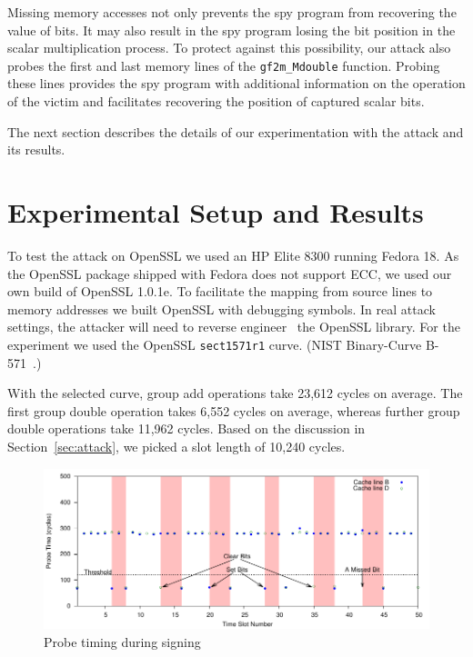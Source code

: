 \documentclass[twocolumn]{svjour3}
\newcommand{\myupcase}[1]{\uppercase{#1}}
\begin{document}
Missing memory accesses not only prevents the spy program from recovering the value of bits.
It may also result in the spy program losing the bit position in the scalar multiplication process.
To protect against this possibility, our attack also probes the first and last memory lines of the 
\texttt{gf2m\_Mdouble} function.
Probing these lines provides the spy program with additional information on the operation of the victim
and facilitates recovering the position of captured scalar bits.


The next section describes the details of our experimentation with the attack and its results.


\section{Experimental Setup and Results}\label{sec:results}

To test the attack on OpenSSL we used an HP Elite 8300 
running Fedora 18.
As the OpenSSL package shipped with Fedora does not support \myupcase{ecc},
we used our own build of OpenSSL 1.0.1e. 
To facilitate the mapping from source lines to memory addresses we built OpenSSL with debugging symbols.
In real attack settings, the attacker will need to reverse engineer~\cite{cipsero10software}
the OpenSSL library.
For the experiment we used the OpenSSL \texttt{sect1571r1} curve.
(NIST Binary-Curve B-571~\cite{fips}.)

With the selected curve, group add operations take 23,612 cycles on average.
The first group double operation takes 6,552 cycles on average, whereas further group double operations take 11,962 cycles.
Based on the discussion in Section~\ref{sec:attack}, we picked a slot length of 10,240 cycles.


\begin{figure}[htb]
\centering\includegraphics[width=\textwidth]{timing}
\caption{Probe timing during signing\label{dgm:timing}}
\end{figure}
\end{document}
